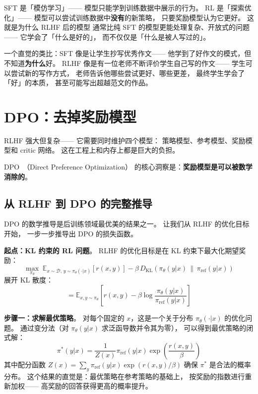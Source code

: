 \begin{whybox}
SFT 是「模仿学习」——
模型只能学到训练数据中展示的行为。
RL 是「探索优化」——
模型可以尝试训练数据中\textbf{没有}的新策略，
只要奖励模型认为它更好。
这就是为什么 RLHF 后的模型
通常比纯 SFT 的模型更能处理复杂、开放式的问题——
它学会了「什么是好的」，
而不仅仅是「什么是被人写过的」。

一个直觉的类比：SFT 像是让学生抄写优秀作文——
他学到了好作文的模式，但不知道\textbf{为什么}好。
RLHF 像是有一位老师不断评价学生自己写的作文——
学生可以尝试新的写作方式，
老师告诉他哪些尝试更好、哪些更差，
最终学生学会了「好」的本质，
甚至可能写出超越范文的作品。
\end{whybox}

\section{DPO：去掉奖励模型}

RLHF 强大但复杂——
它需要同时维护四个模型：
策略模型、参考模型、奖励模型和 critic 网络。
这在工程上和内存上都是巨大的负担。

DPO~\cite{rafailov2023dpo}（Direct Preference Optimization）
的核心洞察是：\textbf{奖励模型是可以被数学消除的}。

\subsection{从 RLHF 到 DPO 的完整推导}

DPO 的数学推导是后训练领域最优美的结果之一。
让我们从 RLHF 的优化目标开始，
一步一步推导出 DPO 的损失函数。

\textbf{起点：KL 约束的 RL 问题}。
RLHF 的优化目标是在 KL 约束下最大化期望奖励：
\begin{equation}
  \max_{\pi_\theta} \; \mathbb{E}_{x \sim \mathcal{D},\, y \sim \pi_\theta(\cdot|x)}
  \!\left[ r(x, y) \right]
  - \beta \, D_{\text{KL}}\!\left(\pi_\theta(y|x) \,\|\, \pi_{\text{ref}}(y|x)\right)
  \label{eq:rlhf-objective}
\end{equation}
展开 KL 散度：
\begin{equation}
  = \mathbb{E}_{x, y \sim \pi_\theta}\!\left[
    r(x,y) - \beta \log \frac{\pi_\theta(y|x)}{\pi_{\text{ref}}(y|x)}
  \right]
\end{equation}

\textbf{步骤一：求解最优策略}。
对每个固定的 $x$，这是一个关于分布 $\pi_\theta(\cdot|x)$ 的优化问题。
通过变分法（对 $\pi_\theta(y|x)$ 求泛函导数并令其为零），
可以得到最优策略的闭式解：
\begin{equation}
  \pi^*(y|x) = \frac{1}{Z(x)} \pi_{\text{ref}}(y|x) \exp\!\left(\frac{r(x,y)}{\beta}\right)
  \label{eq:optimal-policy}
\end{equation}
其中配分函数 $Z(x) = \sum_y \pi_{\text{ref}}(y|x) \exp(r(x,y)/\beta)$
确保 $\pi^*$ 是合法的概率分布。
这个结果的直觉是：最优策略在参考策略的基础上，
按奖励的指数进行重新加权——
高奖励的回答获得更高的概率提升。


